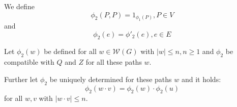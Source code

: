 We define \[ \phi_2(P,P) = 1_{\phi_1(P)}, P \in V \] and \[ \phi_2(e) =
\phi'_2(e), e \in E \]

Let $\phi_2(w)$ be defined for all $w \in \mathcal{W}(G)$ with $|w| \leq n, n
\geq 1$ and $\phi_2$ be compatible with $Q$ and $Z$ for all these paths $w$.

Further let $\phi_2$ be uniquely determined for these paths $w$ and it holds: \[
\phi_2(w \cdot v) = \phi_2(w) \cdot \phi_2(u) \]
for all $w, v$ with $|w \cdot v| \leq n$.















































